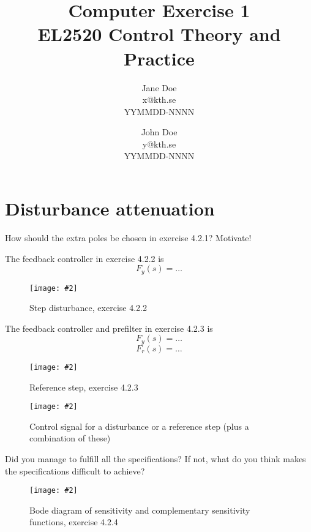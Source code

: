\documentclass[a4paper,11pt]{article}
\title{
	Computer Exercise 1\\
	EL2520 Control Theory and Practice
}
\author{
	Jane Doe\\
	x@kth.se\\
	YYMMDD-NNNN
	\and
	John Doe\\
	y@kth.se\\
	YYMMDD-NNNN
}
\newcommand{\image}[3][width=1.0\columnwidth]{
	\begin{figure}[h!]
		\centering
	    \texttt{[image: \#2]}
		\caption{#3}
		\label{fig:#2}
	\end{figure}
}
\begin{document}
	\maketitle

	\section*{Disturbance attenuation}
	
	How should the extra poles be chosen in exercise 4.2.1? Motivate! 
	\par\dotfill\par\dotfill\par

	The feedback controller in exercise 4.2.2 is
	\[
		F_y(s) = \ldots
	\]

	\image{figure_1.pdf}{Step disturbance, exercise 4.2.2}
	
	The feedback controller and prefilter in exercise 4.2.3 is 
	\[
	F_y(s) = \ldots
	\]
	\[
	F_r(s) = \ldots
	\]
	\image{figure_2.pdf}{Reference step, exercise 4.2.3}
	\image{figure_3.pdf}{Control signal for a disturbance or a reference step (plus a combination of these)}

	Did you manage to fulfill all the specifications? If not, what do you think makes the specifications difficult to achieve?
	\par\dotfill\par\dotfill\par
	
	\image{figure_4.pdf}{Bode diagram of sensitivity and complementary sensitivity functions, exercise 4.2.4}
\end{document}
